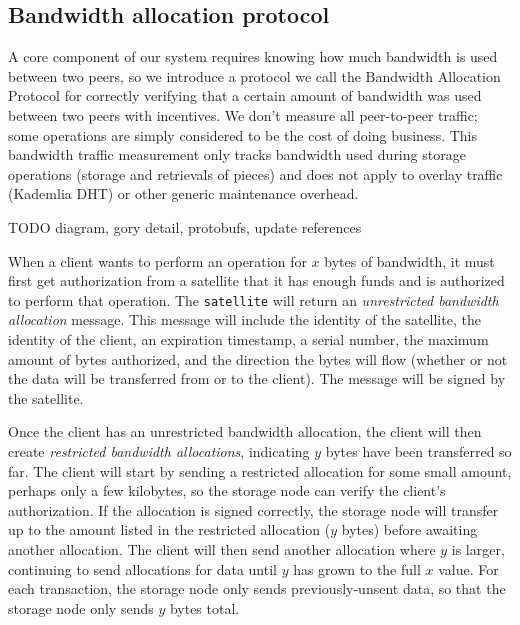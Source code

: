 \documentclass[11pt,fleqn,openany]{book}
\newcommand{\x}[1]{{\tt #1}} \newcommand{\code}[1]{{\em #1}}
\newcommand{\todo}[1]{{\color{red} TODO #1 }}
\begin{document}
\subsection{Bandwidth allocation protocol}\label{bap}

A core component of our system requires knowing how much bandwidth is used
between two peers, so we introduce a protocol we call the Bandwidth Allocation
Protocol for correctly verifying that a certain amount of bandwidth was used
between two peers with incentives.
We don't measure all peer-to-peer traffic;
some operations are simply considered to be
the cost of doing business. This bandwidth traffic measurement only tracks
bandwidth used during storage operations (storage and retrievals of pieces)
and does not apply to overlay traffic (Kademlia DHT) or other generic
maintenance overhead.

\todo{diagram, gory detail, protobufs, update references}

When a client wants to perform an operation for $x$ bytes of bandwidth, it must
first get authorization from a satellite
that it has enough funds and is authorized to perform that operation.
The \x{satellite} will return an {\em unrestricted
bandwidth allocation} message. This message will include the identity of the
satellite, the identity of the client, an expiration timestamp, a serial number,
the maximum amount of bytes authorized, and the direction the bytes will flow
(whether or not the data will be transferred from or to the client).
The message will be signed by the satellite.


Once the client has an unrestricted bandwidth allocation, the client will then
create {\em restricted bandwidth allocations},
indicating $y$ bytes have been transferred so far. The client
will start by sending a restricted allocation for some small amount,
perhaps only a few kilobytes,
so the storage node can verify the client's authorization.
If the allocation is signed correctly, the storage node will
transfer up to the amount listed in the restricted allocation ($y$ bytes) before
awaiting another allocation. The client will then send another allocation where
$y$ is larger, continuing to send allocations for data until $y$ has grown to
the full $x$ value.
For each transaction, the storage node only sends previously-unsent data,
so that the storage node only sends $y$ bytes total.
\end{document}
